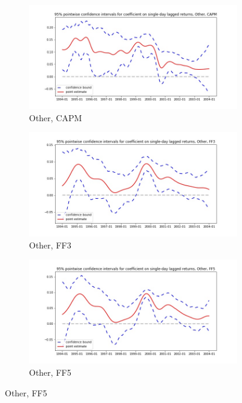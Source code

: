 \documentclass{article}
\begin{document}
 \begin{figure}
  \centering
  \begin{subfigure}[b]{0.3\textwidth}
    \centering
    \includegraphics[width=\textwidth]{Other/pointwiseCIs_CAPM.jpg}
    \caption{Other, CAPM}
    \label{fig:1}
  \end{subfigure}
  \begin{subfigure}[b]{0.3\textwidth}
    \centering
    \includegraphics[width=\textwidth]{Other/pointwiseCIs_FF3.jpg}
    \caption{Other, FF3}
    \label{fig:2}
  \end{subfigure}
    \begin{subfigure}[b]{0.3\textwidth}
    \centering
    \includegraphics[width=\textwidth]{Other/pointwiseCIs_FF5.jpg}
    \caption{Other, FF5}
    \label{fig:1}
  \end{subfigure}
  \end{figure}
        
  
\end{document}
